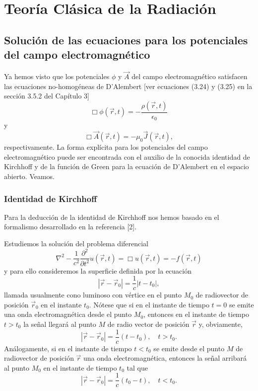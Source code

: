 \documentclass[12pt,a4paper]{book}
\begin{document}
\chapter{Teoría Clásica de la Radiación}
\section{Solución de las ecuaciones para los potenciales del campo electromagnético}

Ya hemos visto que los potenciales $\phi$ y $\vec{A}$ del campo electromagnético satisfacen las ecuaciones no-homogéneas de D'Alembert [ver ecuaciones (3.24) y (3.25) en la sección 3.5.2 del Capítulo 3]
\begin{equation}
\Box\phi(\vec{r}, t) = -\frac{\rho(\vec{r}, t)}{\epsilon_0}
\end{equation}
y
\begin{equation}
\Box\vec{A}(\vec{r}, t) = -\mu_0 \vec{J}(\vec{r}, t),
\end{equation}
respectivamente. La forma explícita para los potenciales del campo electromagnético puede ser encontrada con el auxilio de la conocida identidad de Kirchhoff y de la función de Green para la ecuación de D'Alembert en el espacio abierto. Veamos.

\subsection{Identidad de Kirchhoff}

Para la deducción de la identidad de Kirchhoff nos hemos basado en el formalismo desarrollado en la referencia [2].

Estudiemos la solución del problema diferencial
\begin{equation}
\nabla^2 - \frac{1}{c^2}\frac{\partial^2}{\partial t^2}u(\vec{r}, t) = \Box u(\vec{r}, t) = -f(\vec{r}, t)
\end{equation}
y para ello consideremos la superficie definida por la ecuación
\begin{equation}
|\vec{r} - \vec{r}_0| = \frac{1}{c}|t - t_0|,
\end{equation}
llamada usualmente cono luminoso con vértice en el punto $M_0$ de radiovector de posición $\vec{r}_0$ en el instante $t_0$. Nótese que si en el instante de tiempo $t = 0$ se emite una onda electromagnética desde el punto $M_0$, entonces en el instante de tiempo $t > t_0$ la señal llegará al punto $M$ de radio vector de posición $\vec{r}$ y, obviamente,
\begin{equation}
|\vec{r} - \vec{r}_0| = \frac{1}{c}(t - t_0), \quad t > t_0.
\end{equation}
Análogamente, si en el instante de tiempo $t < t_0$ se emite desde el punto $M$ de radiovector de posición $\vec{r}$ una onda electromagnética, entonces la señal arribará al punto $M_0$ en el instante de tiempo $t_0$ tal que
\begin{equation}
|\vec{r} - \vec{r}_0| = \frac{1}{c}(t_0 - t), \quad t < t_0.
\end{equation}
\end{document}
